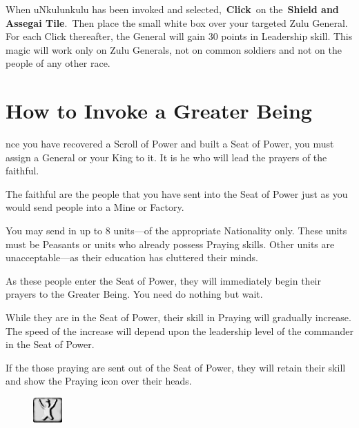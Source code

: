 When uNkulunkulu has been invoked and selected, \textbf{Click} on the \textbf{Shield and Assegai Tile}. Then place the small white box over your targeted Zulu General. For each Click thereafter, the General will gain 30 points in Leadership skill. This magic will work only on Zulu Generals, not on common soldiers and not on the people of any other race.

\section{How to Invoke a Greater Being}


nce you have recovered a Scroll of Power and built a Seat of Power, you must assign a General or your King to it. It is he who will lead the prayers of the faithful.

The faithful are the people that you have sent into the Seat of Power just as you would send people into a Mine or Factory.

You may send in up to 8 units---of the appropriate Nationality only. These units must be Peasants or units who already possess Praying skills. Other units are unacceptable---as their education has cluttered their minds.

As these people enter the Seat of Power, they will immediately begin their prayers to the Greater Being. You need do nothing but wait.

While they are in the Seat of Power, their skill in Praying will gradually increase. The speed of the increase will depend upon the leadership level of the commander in the Seat of Power.

If the those praying are sent out of the Seat of Power, they will retain their skill and show the Praying icon over their heads.

\begin{figure}
	\vspace{-20pt}
	\begin{center}
		\includegraphics[width=0.1\textwidth]{Tinvoke}
	\end{center}
	\vspace{-20pt}
\end{figure}


